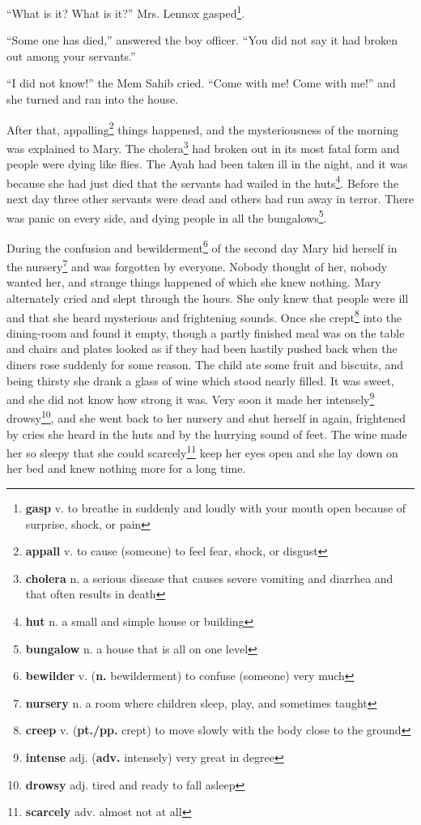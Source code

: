 ``What is it? What is it?'' Mrs. Lennox gasped\footnote{\textbf{gasp} v. to breathe in suddenly and loudly with your mouth open because of surprise, shock, or pain}.

``Some one has died,'' answered the boy officer. ``You did not say it had broken out among your servants.''

``I did not know!'' the Mem Sahib cried. ``Come with me! Come with me!'' and she turned and ran into the house.

After that, appalling\footnote{\textbf{appall} v. to cause (someone) to feel fear, shock, or disgust} things happened, and the mysteriousness of the morning was explained to Mary. The cholera\footnote{\textbf{cholera} n. a serious disease that causes severe vomiting and diarrhea and that often results in death} had broken out in its most fatal form and people were dying like flies. The Ayah had been taken ill in the night, and it was because she had just died that the servants had wailed in the huts\footnote{\textbf{hut} n. a small and simple house or building}. Before the next day three other servants were dead and others had run away in terror. There was panic on every side, and dying people in all the bungalows\footnote{\textbf{bungalow} n. a house that is all on one level}.

During the confusion and bewilderment\footnote{\textbf{bewilder} v. (\textbf{n.} bewilderment) to confuse (someone) very much} of the second day Mary hid herself in the nursery\footnote{\textbf{nursery} n. a room where children sleep, play, and sometimes taught} and was forgotten by everyone. Nobody thought of her, nobody wanted her, and strange things happened of which she knew nothing. Mary alternately cried and slept through the hours. She only knew that people were ill and that she heard mysterious and frightening sounds. Once she crept\footnote{\textbf{creep} v. (\textbf{pt./pp.} crept) to move slowly with the body close to the ground} into the dining-room and found it empty, though a partly finished meal was on the table and chairs and plates looked as if they had been hastily pushed back when the diners rose suddenly for some reason. The child ate some fruit and biscuits, and being thirsty she drank a glass of wine which stood nearly filled. It was sweet, and she did not know how strong it was. Very soon it made her intensely\footnote{\textbf{intense} adj. (\textbf{adv.} intensely) very great in degree} drowsy\footnote{\textbf{drowsy} adj. tired and ready to fall asleep}, and she went back to her nursery and shut herself in again, frightened by cries she heard in the huts and by the hurrying sound of feet. The wine made her so sleepy that she could scarcely\footnote{\textbf{scarcely} adv. almost not at all} keep her eyes open and she lay down on her bed and knew nothing more for a long time.

